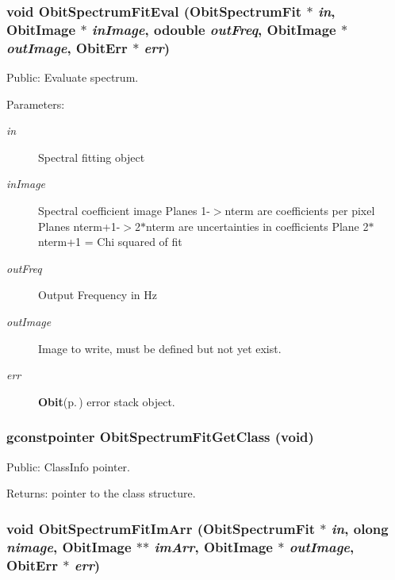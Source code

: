 \subsubsection{\setlength{\rightskip}{0pt plus 5cm}void Obit\-Spectrum\-Fit\-Eval ({\bf Obit\-Spectrum\-Fit} $\ast$ {\em in}, {\bf Obit\-Image} $\ast$ {\em in\-Image}, {\bf odouble} {\em out\-Freq}, {\bf Obit\-Image} $\ast$ {\em out\-Image}, {\bf Obit\-Err} $\ast$ {\em err})}\label{ObitSpectrumFit_8h_a16}


Public: Evaluate spectrum. 

\begin{Desc}
\item[Parameters:]
\begin{description}
\item[{\em in}]Spectral fitting object \item[{\em in\-Image}]Spectral coefficient image Planes 1-$>$nterm are coefficients per pixel Planes nterm+1-$>$2$\ast$nterm are uncertainties in coefficients Plane 2$\ast$nterm+1 = Chi squared of fit \item[{\em out\-Freq}]Output Frequency in Hz \item[{\em out\-Image}]Image to write, must be defined but not yet exist. \item[{\em err}]{\bf Obit}{\rm (p.\,\pageref{structObit})} error stack object. \end{description}
\end{Desc}
\subsubsection{\setlength{\rightskip}{0pt plus 5cm}gconstpointer Obit\-Spectrum\-Fit\-Get\-Class (void)}\label{ObitSpectrumFit_8h_a11}


Public: Class\-Info pointer. 

\begin{Desc}
\item[Returns:]pointer to the class structure. \end{Desc}
\subsubsection{\setlength{\rightskip}{0pt plus 5cm}void Obit\-Spectrum\-Fit\-Im\-Arr ({\bf Obit\-Spectrum\-Fit} $\ast$ {\em in}, {\bf olong} {\em nimage}, {\bf Obit\-Image} $\ast$$\ast$ {\em im\-Arr}, {\bf Obit\-Image} $\ast$ {\em out\-Image}, {\bf Obit\-Err} $\ast$ {\em err})}\label{ObitSpectrumFit_8h_a15}


